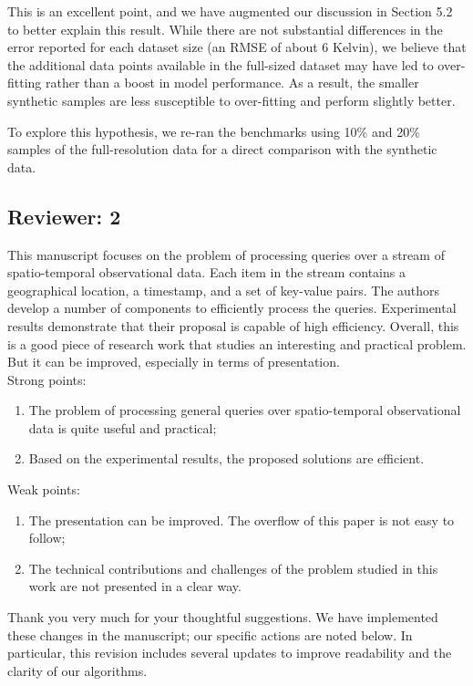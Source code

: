 \documentclass{article}
\begin{document}
\begin{tcolorbox}
This is an excellent point, and we have augmented our discussion in Section 5.2 to better explain this result. While there are not substantial differences in the error reported for each dataset size (an RMSE of about 6 Kelvin), we believe that the additional data points available in the full-sized dataset may have led to over-fitting rather than a boost in model performance. As a result, the smaller synthetic samples are less susceptible to over-fitting and perform slightly better.

To explore this hypothesis, we re-ran the benchmarks using 10\% and 20\% samples of the full-resolution data for a direct comparison with the synthetic data. %
\end{tcolorbox}

\subsection*{Reviewer: 2}\label{reviewer-2}
This manuscript focuses on the problem of processing queries over a stream of spatio-temporal observational data. Each item in the stream contains a geographical location, a timestamp, and a set of key-value pairs. The authors develop a number of components to efficiently process the queries. Experimental results demonstrate that their proposal is capable of high efficiency. Overall, this is a good piece of research work that studies an interesting and practical problem. But it can be improved, especially in terms of presentation. \\
%
Strong points:
\begin{enumerate}
    \item The problem of processing general queries over spatio-temporal observational data is quite useful and practical;
    \item Based on the experimental results, the proposed solutions are efficient.
\end{enumerate}
%
Weak points:
\begin{enumerate}
    \item The presentation can be improved. The overflow of this paper is not easy to follow;
    \item The technical contributions and challenges of the problem studied in this work are not presented in a clear way.
\end{enumerate}

\begin{tcolorbox}
    Thank you very much for your thoughtful suggestions. We have implemented these changes in the manuscript; our specific actions are noted below. In particular, this revision includes several updates to improve readability and the clarity of our algorithms.
\end{tcolorbox}
\end{document}

